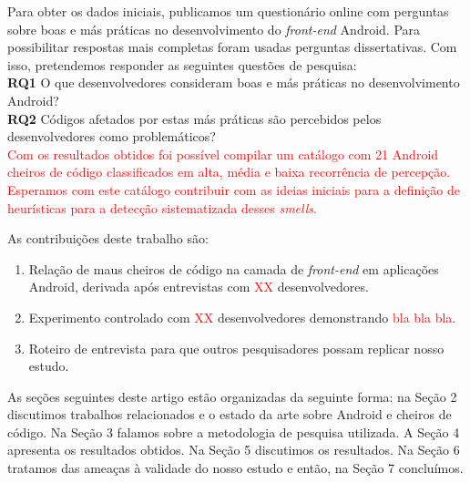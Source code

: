 Para obter os dados iniciais, publicamos um question\'ario online com perguntas sobre boas e m\'as pr\'aticas no desenvolvimento do \textit{front-end} Android. Para possibilitar respostas mais completas foram usadas perguntas dissertativas. Com isso, pretendemos responder as seguintes quest\~oes de pesquisa: \\

\textbf{RQ1} O que desenvolvedores consideram boas e m\'as pr\'aticas no desenvolvimento Android? \\

\textbf{RQ2} C\'odigos afetados por estas m\'as pr\'aticas s\~ao percebidos pelos desenvolvedores como problem\'aticos? \\

 \textcolor{red}{Com os resultados obtidos foi poss\'ivel compilar um cat\'alogo com 21 Android cheiros de c\'odigo classificados em alta, m\'edia e baixa recorr\^encia de percep\c{c}\~ao. Esperamos com este cat\'alogo contribuir com as ideias iniciais para a defini\c{c}\~ao de heur\'isticas para a detec\c{c}\~ao sistematizada desses \textit{smells}.}

As contribuições deste trabalho são:

\begin{enumerate}

	\item Relação de maus cheiros de código na camada
	de \textit{front-end} em aplicações Android, derivada após
	entrevistas com \textcolor{red}{XX} desenvolvedores.

	\item Experimento controlado com \textcolor{red}{XX} 
	desenvolvedores demonstrando \textcolor{red}{bla bla bla}.

	\item Roteiro de entrevista para que outros pesquisadores
	possam replicar nosso estudo.
\end{enumerate}

As se\c{c}\~oes seguintes deste artigo est\~ao organizadas da seguinte forma: na Se\c{c}\~ao 2 discutimos trabalhos relacionados e o estado da arte sobre Android e cheiros de c\'odigo. Na Se\c{c}\~ao 3 falamos sobre a metodologia de pesquisa utilizada. A Se\c{c}\~ao 4 apresenta os resultados obtidos. Na Se\c{c}\~ao 5 discutimos os resultados. Na Se\c{c}\~ao 6 tratamos das amea\c{c}as \`a validade do nosso estudo e ent\~ao, na Se\c{c}\~ao 7 conclu\'imos.
